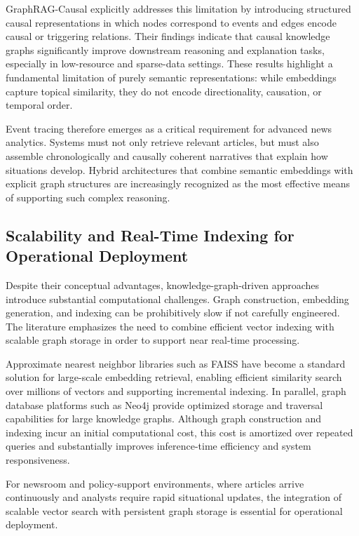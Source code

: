 \documentclass[preprint,10pt]{article}
\begin{document}
GraphRAG-Causal\cite{Haque2025} explicitly addresses this limitation by introducing structured causal representations in which nodes correspond to events and edges encode causal or triggering relations. Their findings indicate that causal knowledge graphs significantly improve downstream reasoning and explanation tasks, especially in low-resource and sparse-data settings. These results highlight a fundamental limitation of purely semantic representations: while embeddings capture topical similarity, they do not encode directionality, causation, or temporal order.

Event tracing therefore emerges as a critical requirement for advanced news analytics. Systems must not only retrieve relevant articles, but must also assemble chronologically and causally coherent narratives that explain how situations develop. Hybrid architectures that combine semantic embeddings with explicit graph structures are increasingly recognized as the most effective means of supporting such complex reasoning.

\subsection{Scalability and Real-Time Indexing for Operational Deployment}

Despite their conceptual advantages, knowledge-graph-driven approaches introduce substantial computational challenges\cite{BichTram2025}. Graph construction, embedding generation, and indexing can be prohibitively slow if not carefully engineered. The literature emphasizes the need to combine efficient vector indexing with scalable graph storage in order to support near real-time processing.

Approximate nearest neighbor libraries such as FAISS have become a standard solution for large-scale embedding retrieval\cite{douze2025faiss}, enabling efficient similarity search over millions of vectors and supporting incremental indexing. In parallel, graph database platforms such as Neo4j provide optimized storage and traversal capabilities for large knowledge graphs. Although graph construction and indexing incur an initial computational cost, this cost is amortized over repeated queries and substantially improves inference-time efficiency and system responsiveness.

For newsroom and policy-support environments, where articles arrive continuously and analysts require rapid situational updates, the integration of scalable vector search with persistent graph storage is essential for operational deployment.
\end{document}
